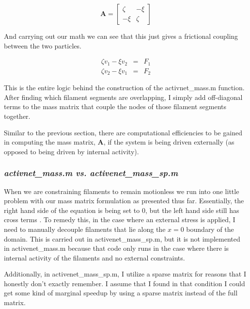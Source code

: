 \begin{equation}
\mathbf{A} = \begin{bmatrix} \zeta & -\xi \\ -\xi & \zeta \end{bmatrix}
\end{equation}

And carrying out our math we can see that this just gives a frictional coupling between the two particles.

\begin{equation}
\begin{array}{lcl} \zeta v_1 - \xi v_2  & = & F_1 \\ \zeta v_2 - \xi v_1 & = & F_2 \end{array}
\end{equation}

This is the entire logic behind the construction of the activnet\_mass.m function.  After finding which filament segments are overlapping, I simply add off-diagonal terms to the mass matrix that couple the nodes of those filament segments together.

Similar to the previous section, there are computational efficiencies to be gained in computing the mass matrix, $\mathbf{A}$, if the system is being driven externally (as opposed to being driven by internal activity).  

\subsubsection{\textit{activnet\_mass.m vs. activenet\_mass\_sp.m}}
When we are constraining filaments to remain motionless we run into one little problem with our mass matrix formulation as presented thus far.  Essentially, the right hand side of the equation is being set to 0, but the left hand side still has cross terms .  To remedy this, in the case where an external stress is applied, I need to manually decouple filaments that lie along the $x=0$ boundary of the domain.  This is carried out in activenet\_mass\_sp.m, but it is not implemented in activenet\_mass.m because that code only runs in the case where there is internal activity of the filaments and no external constraints.

Additionally, in activenet\_mass\_sp.m, I utilize a sparse matrix for reasons that I honestly don't exactly remember.  I assume that I found in that condition I could get some kind of marginal speedup by using a sparse matrix instead of the full matrix.


